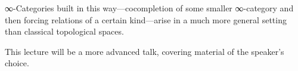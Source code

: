 \documentclass[a4paper]{amsart}
\numberwithin{figure}{section}
\theoremstyle{theorem}
\theoremstyle{definition}
\newcommand{\sSet}{{{Set}_\Delta}}
\begin{document}
∞-Categories built in this way---cocompletion of some smaller ∞-category and then forcing relations of a certain kind---arise in a much more general setting than classical topological spaces. %


%
%

This lecture will be a more advanced talk, covering material of the speaker's choice.
\end{document}
